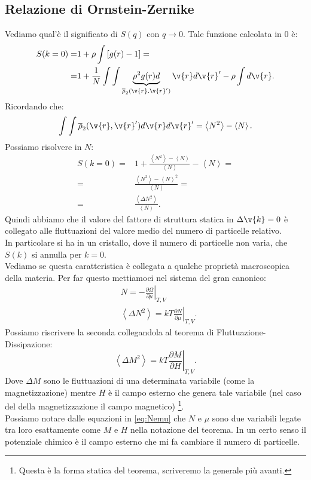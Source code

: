 \subsection{Relazione di Ornstein-Zernike}
\label{subsec:Relazione di Ornstein-Zernike}
Vediamo qual'è il significato di $S(q)$ con $q\to 0$. Tale funzione calcolata in 0 è:
\[\begin{aligned}
	S(k=0)
	=&
	1+\rho \int\left[ g(r)-1 \right] =\\
	=&
	1 + \frac{1}{N} \int\int 
	\underbrace{
	\rho ^2g(r)d 
	}_{\overline{\rho }_2(\v{r}.\v{r}')}
	\v{r}d \v{r}'
	-
	\rho \int d \v{r}
.\end{aligned}\]
Ricordando che:
\[
	\int\int \overline{\rho }_2(\v{r},\v{r}')d \v{r} d \v{r}'
	=
	\left<N^2 \right>- \left<N \right>
.\] 
Possiamo risolvere in $N$:
\[\begin{aligned}
	S(k=0)
	=&
	1 + \frac{\left<N^2\right> - \left<N \right>}{\left<N \right>} - \left<N \right>=\\
	=&
	\frac{\left<N^2 \right>-\left<N \right>^2}{\left<N \right>} =\\
	=&
	\frac{\left<\Delta N^2 \right>}{\left<N \right>}
	\label{eq:Orne2}
.\end{aligned}\]
Quindi abbiamo che il valore del fattore di struttura statica in $\Delta\v{k}=0$ è collegato alle fluttuazioni del valore medio del numero di particelle relativo.\\
In particolare si ha in un cristallo, dove il numero di particelle non varia, che $S(k)$ si annulla per $k=0$. \\
Vediamo se questa caratteristica è collegata a qualche proprietà macroscopica della materia. Per far questo mettiamoci nel sistema del gran canonico:
\[\begin{aligned}
	&N = -\left.\frac{\partial \Omega }{\partial \mu} \right|_{T,V}\\
	& \left<\Delta N^2 \right> = kT\left.\frac{\partial N}{\partial \mu} \right|_{T,V}
		\label{eq:Nemu}
.\end{aligned}\]
Possiamo riscrivere la seconda collegandola al teorema di Fluttuazione-Dissipazione:
\[
	\left<\Delta M^2 \right>=kT\left.\frac{\partial M}{\partial H} \right|_{T,V}
.\] 
Dove $\Delta M$ sono le fluttuazioni di una determinata variabile (come la magnetizzazione) mentre $H$ è il campo esterno che genera tale variabile (nel caso del della magnetizzazione il campo magnetico) \footnote{Questa è la forma statica del teorema, scriveremo la generale più avanti.}. \\
Possiamo notare dalle equazioni in \ref{eq:Nemu} che $N $ e $\mu$ sono due variabili legate tra loro esattamente come $M$ e $H$ nella notazione del teorema. In un certo senso il potenziale chimico è il campo esterno che mi fa cambiare il numero di particelle.\\
